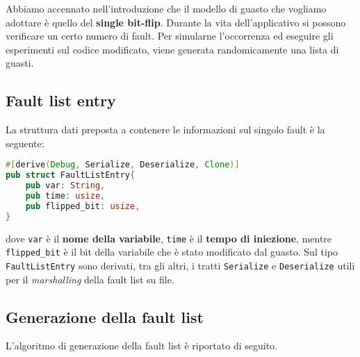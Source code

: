 \noindent
Abbiamo accennato nell'introduzione che il modello di guasto che vogliamo adottare è quello del \textbf{single bit-flip}. Durante la vita dell'applicativo si possono verificare un certo numero di fault. Per simularne l'occorrenza ed eseguire gli esperimenti sul codice modificato, viene generata randomicamente una lista di guasti.

\subsection{Fault list entry}
La struttura dati preposta a contenere le informazioni sul singolo fault è la seguente: 
\begin{lstlisting}[language=rust, style=boxed]
#[derive(Debug, Serialize, Deserialize, Clone)]
pub struct FaultListEntry{
    pub var: String,
    pub time: usize,
    pub flipped_bit: usize,
}
\end{lstlisting}
dove \texttt{var} è il \textbf{nome della variabile}, \texttt{time} è il \textbf{tempo di iniezione}, mentre \texttt{flipped\_bit} è il bit della variabile che è stato modificato dal guasto. Sul tipo \texttt{FaultListEntry} sono derivati, tra gli altri, i tratti \texttt{Serialize} e \texttt{Deserialize} utili per il \textit{marshalling} della fault list su file.

\subsection{Generazione della fault list}
L'algoritmo di generazione della  fault list è riportato di seguito.

